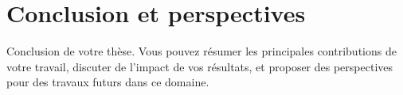 \chapter*{Conclusion et perspectives}

Conclusion de votre thèse. Vous pouvez résumer les principales contributions de votre travail, discuter de l'impact de vos résultats, et proposer des perspectives pour des travaux futurs dans ce domaine.